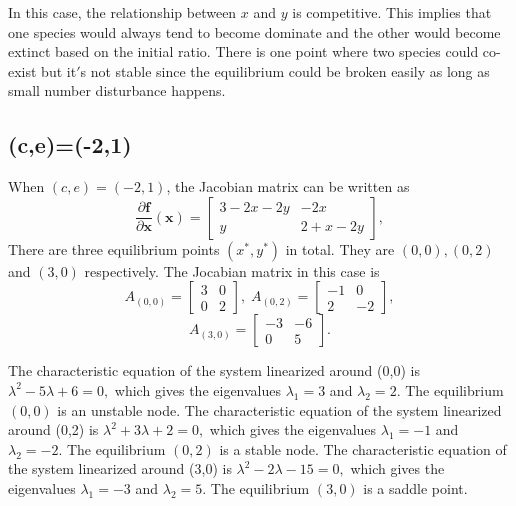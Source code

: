 \documentclass[a4paper,twocolumn]{article} %
\begin{document}
In this case, the relationship between $x$ and $y$ is competitive. This implies that one species would always tend to become dominate and the other would become extinct based on the initial ratio. There is one point where two species could co-exist but it$'$s not stable since the equilibrium could be broken easily as long as small number disturbance happens.  

\subsection{(c,e)=(-2,1)}
When $(c,e)=(-2,1)$, the Jacobian matrix can be written as
\begin{equation*}
    \frac{\partial\textbf{f}}{\partial \textbf{x}}(\textbf{x}) =
    \left[\begin{array}{cc}
    3-2x-2y & -2x \\
    y & 2+x-2y
    \end{array}\right],
\end{equation*}
There are three equilibrium points $(x^*,y^*)$ in total. They are $(0,0),(0,2)$ and $(3,0)$ respectively. The Jocabian matrix in this case is
\begin{equation*}
    A_{(0,0)} =
    \left[\begin{array}{cc}
    3 & 0 \\
    0 & 2
    \end{array}\right], \; A_{(0,2)} =
    \left[\begin{array}{cc}
    -1 & 0 \\
    2 & -2
    \end{array}\right],   
    \end{equation*}
    \begin{equation*}
    A_{(3,0)} =
    \left[\begin{array}{cc}
    -3 & -6 \\
    0 & 5
    \end{array}\right].
\end{equation*}

The characteristic equation of the system linearized around \mbox{(0,0)} is
$\lambda^2 -5 \lambda + 6 = 0,$ which gives the eigenvalues $\lambda_{1} = 3$ and $\lambda_{2} = 2$. The equilibrium $(0,0)$ is an unstable node. 
The characteristic equation of the system linearized around \mbox{(0,2)} is $\lambda^2 +3 \lambda + 2 = 0,$ which gives the eigenvalues $\lambda_1 = -1$ and $\lambda_2 = -2$. The equilibrium $(0,2)$ is a stable node. 
The characteristic equation of the system linearized around \mbox{(3,0)} is $\lambda^2 -2 \lambda - 15 = 0,$ which gives the eigenvalues $\lambda_1 = -3$ and $\lambda_2 = 5$. The equilibrium $(3,0)$ is a saddle point.
\end{document}
